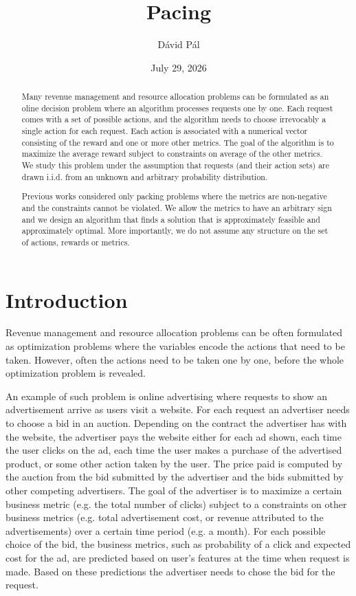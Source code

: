 \documentclass[12pt]{article}
\theoremstyle{definition}
\begin{document}
\title{Pacing}
\author{D\'avid P\'al}
\date{July 29, 2026}

\maketitle

\begin{abstract}
Many revenue management and resource allocation problems can be formulated as
an oline decision problem where an algorithm processes requests one by one. Each
request comes with a set of possible actions, and the algorithm needs to choose
irrevocably a single action for each request. Each action is associated with a
numerical vector consisting of the reward and one or more other metrics. The
goal of the algorithm is to maximize the average reward subject to constraints
on average of the other metrics. We study this problem under the assumption that
requests (and their action sets) are drawn i.i.d. from an unknown and arbitrary
probability distribution.

Previous works considered only packing problems where the metrics are
non-negative and the constraints cannot be violated. We allow the metrics to
have an arbitrary sign and we design an algorithm that finds a solution that is
approximately feasible and approximately optimal. More importantly, we do not
assume any structure on the set of actions, rewards or metrics.
\end{abstract}

\section{Introduction}

Revenue management and resource allocation problems can be often formulated as
optimization problems where the variables encode the actions that need to be
taken. However, often the actions need to be taken one by one, before the whole
optimization problem is revealed.

An example of such problem is online advertising where requests to show an
advertisement arrive as users visit a website. For each request an advertiser
needs to choose a bid in an auction. Depending on the contract the advertiser
has with the website, the advertiser pays the website either for each ad shown,
each time the user clicks on the ad, each time the user makes a purchase of the
advertised product, or some other action taken by the user. The price paid is
computed by the auction from the bid submitted by the advertiser and the bids
submitted by other competing advertisers. The goal of the advertiser is to
maximize a certain business metric (e.g. the total number of clicks) subject to
a constraints on other business metrics (e.g. total advertisement cost, or
revenue attributed to the advertisements) over a certain time period (e.g. a
month). For each possible choice of the bid, the business metrics, such as
probability of a click and expected cost for the ad, are predicted based on
user's features at the time when request is made. Based on these predictions the
advertiser needs to chose the bid for the request.
\end{document}
